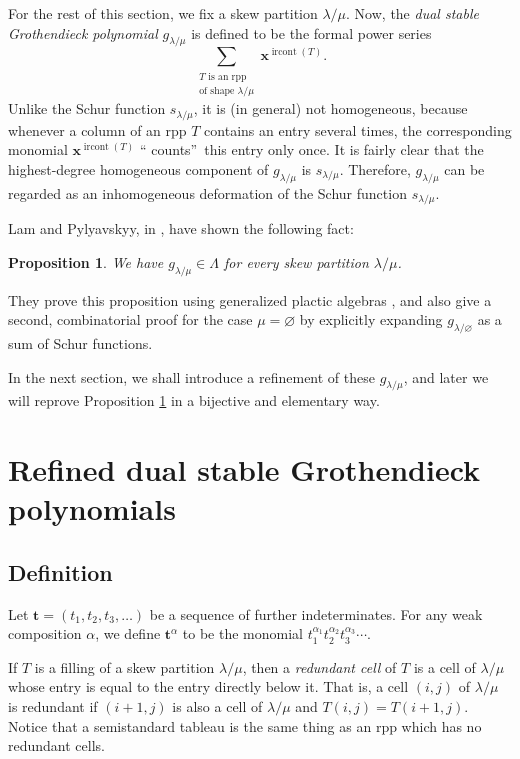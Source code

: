 \documentclass[12pt]{article}
\theoremstyle{plain}
\newtheorem{proposition}[theorem]{Proposition}
\theoremstyle{definition}
\let\sumnonlimits\sum
\renewcommand{\sum}{\sumnonlimits\limits}
\def\t{{\mathbf{t}}}
\def\lm{{\lambda/\mu}}
\begin{document}
For the rest of this section, we fix a skew partition $\lambda/\mu$. Now, the
\textit{dual stable Grothendieck polynomial} $g_{\lambda/\mu}$ is defined to
be the formal power series%
\[
\sum_{\substack{T\text{ is an rpp}\\\text{of shape }\lm}}\mathbf{x}^{\operatorname*{ircont}\left(  T\right)  }.
\]
Unlike the Schur function $s_{\lambda/\mu}$, it is (in
general) not homogeneous, because whenever a column of an rpp $T$ contains an
entry several times, the corresponding monomial $\mathbf{x}%
^{\operatorname*{ircont}\left(  T\right)  }$ \textquotedblleft
counts\textquotedblright\ this entry only once. It is fairly clear that the
highest-degree homogeneous component of $g_{\lambda/\mu}$ is $s_{\lambda/\mu}$.
Therefore, $g_{\lambda/\mu}$ can be regarded as an
inhomogeneous deformation of the Schur function $s_{\lambda/\mu}$.

Lam and Pylyavskyy, in \cite[\S 9.1]{LamPyl}, have shown the following fact:

\begin{proposition}
\label{prop.g.symm}We have $g_{\lambda/\mu}\in\Lambda$ for every skew
partition $\lambda/\mu$.
\end{proposition}


They prove this proposition using generalized plactic algebras \cite[Lemma
3.1]{FomGre}, and also give a second, combinatorial proof for the case
$\mu=\varnothing$ by explicitly expanding $g_{\lambda/\varnothing}$ as a sum
of Schur functions.


In the next section, we shall introduce a refinement of these $g_{\lambda/\mu
}$, and later we will reprove Proposition \ref{prop.g.symm} in a
bijective 
and elementary way.

\section{\label{sect.def}Refined dual stable Grothendieck polynomials}

\subsection{Definition}

 Let $\t=\left(t_{1},t_{2},t_{3},\ldots\right)$ be a sequence of further
indeterminates.
For any weak composition $\alpha$, we define $\t^\alpha$ to be the
monomial $t_1^{\alpha_1} t_2^{\alpha_2} t_3^{\alpha_3} \cdots$.

 If $T$ is a filling of a skew partition $\lm$,
then a \textit{redundant cell} of $T$ is a cell of $\lm$ whose entry is equal to the entry directly below it. That is, a cell $\left(  i,j\right)  $
of $\lm$ is redundant if $\left(  i+1,j\right)  $ is also a cell of $\lm$ and 
$T\left(  i,j\right)  =T\left(  i+1,j\right)  $. Notice that a semistandard
tableau is the same thing as an rpp which has no redundant
cells.
\end{document}
